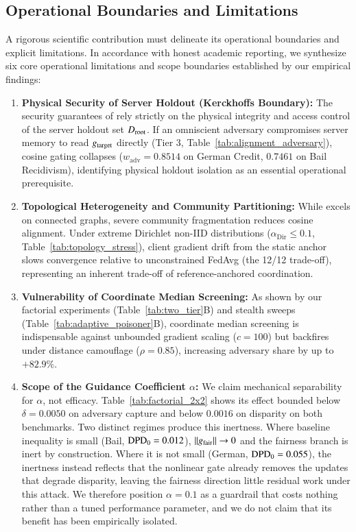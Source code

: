 \subsection{Operational Boundaries and Limitations}
\label{subsec:limitations}

A rigorous scientific contribution must delineate its operational boundaries and explicit limitations. In accordance with honest academic reporting, we synthesize six core operational limitations and scope boundaries established by our empirical findings:
\begin{enumerate}[leftmargin=*]
    \item \textbf{Physical Security of Server Holdout (Kerckhoffs Boundary):} The security guarantees of \MethodName{} rely strictly on the physical integrity and access control of the server holdout set $D_{\mathrm{root}}$. If an omniscient adversary compromises server memory to read $g_{\mathrm{target}}$ directly (Tier 3, Table~\ref{tab:alignment_adversary}), cosine gating collapses ($w_{\mathrm{adv}} = 0.8514$ on German Credit, $0.7461$ on Bail Recidivism), identifying physical holdout isolation as an essential operational prerequisite.
    \item \textbf{Topological Heterogeneity and Community Partitioning:} While \MethodName{} excels on connected graphs, severe community fragmentation reduces cosine alignment. Under extreme Dirichlet non-IID distributions ($\alpha_{\mathrm{Dir}} \le 0.1$, Table~\ref{tab:topology_stress}), client gradient drift from the static anchor slows convergence relative to unconstrained FedAvg (the 12/12 trade-off), representing an inherent trade-off of reference-anchored coordination.
    \item \textbf{Vulnerability of Coordinate Median Screening:} As shown by our factorial experiments (Table~\ref{tab:two_tier}B) and stealth sweeps (Table~\ref{tab:adaptive_poisoner}B), coordinate median screening is indispensable against unbounded gradient scaling ($c=100$) but backfires under distance camouflage ($\rho=0.85$), increasing adversary share by up to $+82.9\%$.
    \item \textbf{Scope of the Guidance Coefficient $\alpha$:} We claim mechanical separability for $\alpha$, not efficacy. Table~\ref{tab:factorial_2x2} shows its effect bounded below $\delta = 0.0050$ on adversary capture and below $0.0016$ on disparity on both benchmarks. Two distinct regimes produce this inertness. Where baseline inequality is small (Bail, $\mathrm{DPD}_0 = 0.012$), $\|g_{\mathrm{fair}}\| \to 0$ and the fairness branch is inert by construction. Where it is not small (German, $\mathrm{DPD}_0 = 0.055$), the inertness instead reflects that the nonlinear gate already removes the updates that degrade disparity, leaving the fairness direction little residual work under this attack. We therefore position $\alpha = 0.1$ as a guardrail that costs nothing rather than a tuned performance parameter, and we do not claim that its benefit has been empirically isolated.

\end{enumerate}

